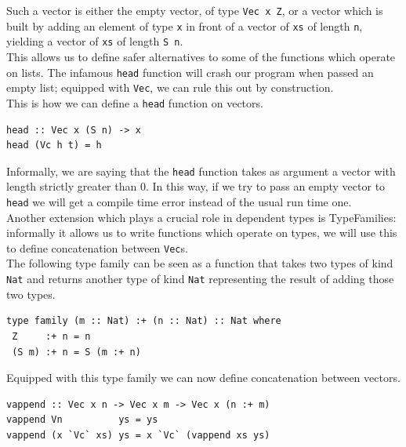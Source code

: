 \documentclass[11pt, titlepage]{article}
\newcommand{\toHaskell}[1]{\texttt{#1}\xspace}
\begin{document}
Such a vector is either the empty vector, of type \toHaskell{Vec x Z}, or a vector which is built by adding an element of type \texttt{x} in front of a vector of \texttt{xs} of length \texttt{n}, yielding a vector of \texttt{xs} of length \texttt{S n}.
\\
This allows us to define safer alternatives to some of the functions which
operate on lists. The infamous \texttt{head} function will
crash our program when passed an empty list; equipped with \texttt{Vec}, we can rule this out by construction. 
\\
This is how we can define a \texttt{head} function on vectors.

\begin{verbatim}
head :: Vec x (S n) -> x
head (Vc h t) = h
\end{verbatim}

Informally, we are saying that the \texttt{head} function takes as
argument a vector with length strictly greater than 0. In this way, if we
try to pass an empty vector to \texttt{head} we will get a compile time
error instead of the usual run time one.
\\
Another extension which plays a crucial role in dependent types is TypeFamilies: informally it allows us to write functions which operate on types, we will use this to define concatenation between \texttt{Vec}s.
\\
The following type family can be seen as a function that takes two types of kind \texttt{Nat} and returns another type of kind \texttt{Nat} representing the result of adding those two types.

\begin{verbatim}
type family (m :: Nat) :+ (n :: Nat) :: Nat where
 Z     :+ n = n
 (S m) :+ n = S (m :+ n)
\end{verbatim}

Equipped with this type family we can now define concatenation between
vectors.

\begin{verbatim}
vappend :: Vec x n -> Vec x m -> Vec x (n :+ m)
vappend Vn          ys = ys
vappend (x `Vc` xs) ys = x `Vc` (vappend xs ys)
\end{verbatim}
\end{document}
